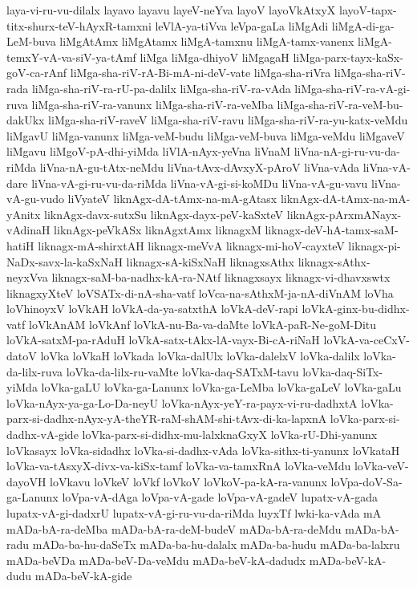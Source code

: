 {laya-vi-ru-vu-dilalx
layavo
layavu
layeV-neYva
layoV
layoVkAtxyX
layoV-tapx-titx-shurx-teV-hAyxR-tamxni
leVlA-ya-tiVva
leVpa-gaLa
liMgAdi
liMgA-di-ga-LeM-buva
liMgAtAmx
liMgAtamx
liMgA-tamxnu
liMgA-tamx-vanenx
liMgA-temxY-vA-va-siV-ya-tAmf
liMga
liMga-dhiyoV
liMgagaH
liMga-parx-tayx-kaSx-goV-ca-rAnf
liMga-sha-riV-rA-Bi-mA-ni-deV-vate
liMga-sha-riVra
liMga-sha-riV-rada
liMga-sha-riV-ra-rU-pa-dalilx
liMga-sha-riV-ra-vAda
liMga-sha-riV-ra-vA-gi-ruva
liMga-sha-riV-ra-vanunx
liMga-sha-riV-ra-veMba
liMga-sha-riV-ra-veM-bu-dakUkx
liMga-sha-riV-raveV
liMga-sha-riV-ravu
liMga-sha-riV-ra-yu-katx-veMdu
liMgavU
liMga-vanunx
liMga-veM-budu
liMga-veM-buva
liMga-veMdu
liMgaveV
liMgavu
liMgoV-pA-dhi-yiMda
liVlA-nAyx-yeVna
liVnaM
liVna-nA-gi-ru-vu-da-riMda
liVna-nA-gu-tAtx-neMdu
liVna-tAvx-dAvxyX-pAroV
liVna-vAda
liVna-vA-dare
liVna-vA-gi-ru-vu-da-riMda
liVna-vA-gi-si-koMDu
liVna-vA-gu-vavu
liVna-vA-gu-vudo
liVyateV
liknAgx-dA-tAmx-na-mA-gAtasx
liknAgx-dA-tAmx-na-mA-yAnitx
liknAgx-davx-sutxSu
liknAgx-dayx-peV-kaSxteV
liknAgx-pArxmANayx-vAdinaH
liknAgx-peVkASx
liknAgxtAmx
liknagxM
liknagx-deV-hA-tamx-saM-hatiH
liknagx-mA-shirxtAH
liknagx-meVvA
liknagx-mi-hoV-cayxteV
liknagx-pi-NaDx-savx-la-kaSxNaH
liknagx-sA-kiSxNaH
liknagxsAthx
liknagx-sAthx-neyxVva
liknagx-saM-ba-nadhx-kA-ra-NAtf
liknagxsayx
liknagx-vi-dhavxswtx
liknagxyXteV
loVSATx-di-nA-sha-vatf
loVca-na-sAthxM-ja-nA-diVnAM
loVha
loVhinoyxV
loVkAH
loVkA-da-ya-satxthA
loVkA-deV-rapi
loVkA-ginx-bu-didhx-vatf
loVkAnAM
loVkAnf
loVkA-nu-Ba-va-daMte
loVkA-paR-Ne-goM-Ditu
loVkA-satxM-pa-rAduH
loVkA-satx-tAkx-lA-vayx-Bi-cA-riNaH
loVkA-va-ceCxV-datoV
loVka
loVkaH
loVkada
loVka-dalUlx
loVka-dalelxV
loVka-dalilx
loVka-da-lilx-ruva
loVka-da-lilx-ru-vaMte
loVka-daq-SATxM-tavu
loVka-daq-SiTx-yiMda
loVka-gaLU
loVka-ga-Lanunx
loVka-ga-LeMba
loVka-gaLeV
loVka-gaLu
loVka-nAyx-ya-ga-Lo-Da-neyU
loVka-nAyx-yeY-ra-payx-vi-ru-dadhxtA
loVka-parx-si-dadhx-nAyx-yA-theYR-raM-shAM-shi-tAvx-di-ka-lapxnA
loVka-parx-si-dadhx-vA-gide
loVka-parx-si-didhx-mu-lalxknaGxyX
loVka-rU-Dhi-yanunx
loVkasayx
loVka-sidadhx
loVka-si-dadhx-vAda
loVka-sithx-ti-yanunx
loVkataH
loVka-va-tAsxyX-divx-va-kiSx-tamf
loVka-va-tamxRnA
loVka-veMdu
loVka-veV-dayoVH
loVkavu
loVkeV
loVkf
loVkoV
loVkoV-pa-kA-ra-vanunx
loVpa-doV-Sa-ga-Lanunx
loVpa-vA-dAga
loVpa-vA-gade
loVpa-vA-gadeV
lupatx-vA-gada
lupatx-vA-gi-dadxrU
lupatx-vA-gi-ru-vu-da-riMda
luyxTf
lwki-ka-vAda
mA
mADa-bA-ra-deMba
mADa-bA-ra-deM-budeV
mADa-bA-ra-deMdu
mADa-bA-radu
mADa-ba-hu-daSeTx
mADa-ba-hu-dalalx
mADa-ba-hudu
mADa-ba-lalxru
mADa-beVDa
mADa-beV-Da-veMdu
mADa-beV-kA-dadudx
mADa-beV-kA-dudu
mADa-beV-kA-gide
}
